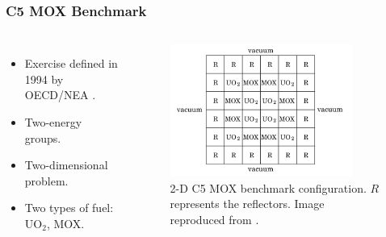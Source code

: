 \begin{frame}
\frametitle{C5 MOX Benchmark}

\begin{columns}
    \column[t]{4cm}
    \begin{itemize}
        \item Exercise defined in 1994 by OECD/NEA \cite{cavarec_benchmark_1994}.
        \item Two-energy groups.
        \item Two-dimensional problem.
        \item Two types of fuel: UO$_2$, MOX.
    \end{itemize}

    \column[t]{6cm}
    \begin{figure}[htbp!]
        \begin{center}
            \includegraphics[width=6cm]{figures/bench-config}
        \end{center}
        \caption{2-D C5 MOX benchmark configuration. $R$ represents the reflectors. Image reproduced from \cite{capilla_applications_2009}.}
    \end{figure}
\end{columns}
\end{frame}


